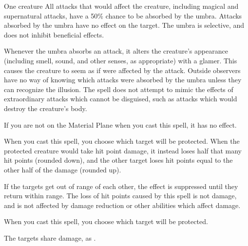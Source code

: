 \spellrng{\rngclose}
\spelldur{\durshort}
\begin{spelltarget}{One creature}
    \spelleffect All attacks that would affect the creature, including magical and supernatural attacks, have a 50\% chance to be absorbed by the umbra. Attacks absorbed by the umbra have no effect on the target. The umbra is selective, and does not inhibit beneficial effects.

    Whenever the umbra absorbs an attack, it alters the creature's appearance (including smell, sound, and other senses, as appropriate) with a glamer. This causes the creature to seem as if were affected by the attack. Outside observers have no way of knowing which attacks were absorbed by the umbra unless they can recognize the illusion. The spell does not attempt to mimic the effects of extraordinary attacks which cannot be disguised, such as attacks which would destroy the creature's body.
\end{spelltarget}
\spellnotes If you are not on the Material Plane when you cast this spell, it has no effect.

\spellrng{\rngmed}
\spelldur{\durlong \dismissable}
\spellspecial When you cast this spell, you choose which target will be protected.
\spellline
\spelleffect When the protected creature would take hit point damage, it instead loses half that many hit points (rounded down), and the other target loses hit points equal to the other half of the damage (rounded up).

If the targets get out of range of each other, the effect is suppressed until they return within range.
\spellnotes The loss of hit points caused by this spell is not damage, and is not affected by damage reduction or other abilities which affect damage.

\spellrng{\rngmed}
\spelldur{\durlong \dismissable}
\spellspecial When you cast this spell, you choose which target will be protected.
\spellline
{}
\begin{spellmargin}
    \spellsuccess The targets share damage, as .
\end{spellmargin}

